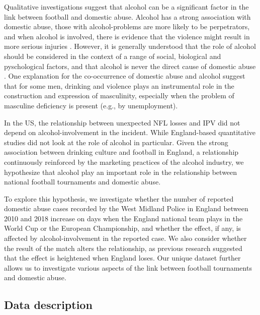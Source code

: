 \documentclass[12pt, letterpaper]{article}
\begin{document}
Qualitative investigations suggest that alcohol can be a significant factor in the link between football and domestic abuse. Alcohol has a strong association with domestic abuse, those with alcohol-problems are more likely to be perpetrators, and when alcohol is involved, there is evidence that the violence might result in more serious injuries \autocite{Peralta2010}. However, it is generally understood that the role of alcohol should be considered in the context of a range of social, biological and pyschological factors, and that alcohol is never the direct cause of domestic abuse \autocite{Javaid2015,Peralta2010}. One explanation for the co-occurrence of domestic abuse and alcohol suggest that for some men, drinking and violence plays an instrumental role in the construction and expression of masculinity, especially when the problem of masculine deficiency is present (e.g., by unemployment)\autocite{Peralta2010}. 

In the US, the relationship between unexpected NFL losses and IPV did not depend on alcohol-involvement in the incident\autocite{Card2011}. While England-based quantitative studies did not look at the role of alcohol in particular. Given the strong association between drinking culture and football in England\autocite{Dixon2014}, a relationship continuously reinforced by the marketing practices of the alcohol industry\autocite{Gornall2014}, we hypothesize that alcohol play an important role in the relationship between national football tournaments and domestic abuse.

To explore this hypothesis, we investigate whether the number of reported domestic abuse cases recorded by the West Midland Police in England between 2010 and 2018 increase on days when the England national team plays in the World Cup or the European Championship, and whether the effect, if any, is affected by alcohol-involvement in the reported case. We also consider whether the result of the match alters the relationship, as previous research suggested that the effect is heightened when England loses\autocite{Kirby2014}. Our unique dataset further allows us to investigate various aspects of the link between football tournaments and domestic abuse.


\newpage

\subsection{Data description}
\end{document}
